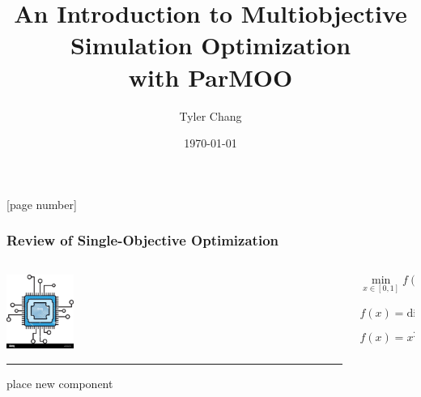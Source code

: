 \documentclass[aspectratio=169]{beamer}
\title{An Introduction to Multiobjective Simulation Optimization\\with ParMOO}
\author{Tyler Chang}
\institute{Mathematics and Computer Science Division,\\
Argonne National Laboratory}
\date{\today}
\begin{document}
{
\frame{\titlepage}
}

[page number]{}

\begin{frame}\frametitle{Review of Single-Objective Optimization}
\begin{columns}
\begin{column}{0.5\textwidth}
\begin{center}

\pause
\includegraphics[width=0.2\textwidth]{chip-icon.jpg}

\bigskip
\bigskip

\pause

\hrule

{\small place new component}

\end{center}
\end{column}
\begin{column}{0.5\textwidth}
\bigskip
{\Large

\pause
$$
\min_{x\in[0,1]} f(x)
$$

\pause
$$
f(x) = \text{dist}(x, \text{chip})^2
$$

\pause
$$
f(x) = x^2
$$
}
\end{column}
\end{columns}
\end{frame}
\end{document}

